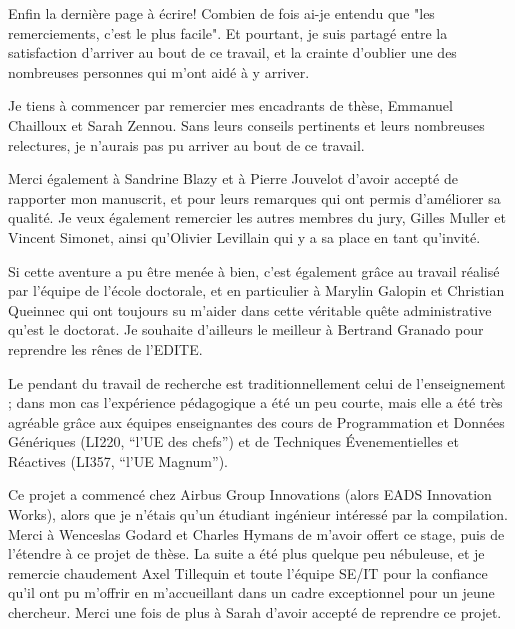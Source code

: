{
\setlength{\parskip}{1ex}

Enfin la dernière page à écrire! Combien de fois ai-je entendu que "les
remerciements, c'est le plus facile". Et pourtant, je suis partagé entre la
satisfaction d'arriver au bout de ce travail, et la crainte d'oublier une des
nombreuses personnes qui m'ont aidé à y arriver.


Je tiens à commencer par remercier mes encadrants de thèse, Emmanuel Chailloux
et Sarah Zennou. Sans leurs conseils pertinents et leurs nombreuses relectures,
je n'aurais pas pu arriver au bout de ce travail.


Merci également à Sandrine Blazy et à Pierre Jouvelot d'avoir accepté de
rapporter mon manuscrit, et pour leurs remarques qui ont permis d'améliorer sa
qualité. Je veux également remercier les autres membres du jury, Gilles Muller
et Vincent Simonet, ainsi qu'Olivier Levillain qui y a sa place en tant
qu'invité.


Si cette aventure a pu être menée à bien, c'est également grâce au travail
réalisé par l'équipe de l'école doctorale, et en particulier à Marylin Galopin
et Christian Queinnec qui ont toujours su m'aider dans cette véritable quête
administrative qu'est le doctorat. Je souhaite d'ailleurs le meilleur à Bertrand
Granado pour reprendre les rênes de l'EDITE.


Le pendant du travail de recherche est traditionnellement celui de
l'enseignement ; dans mon cas l'expérience pédagogique a été un peu courte, mais
elle a été très agréable grâce aux équipes enseignantes des cours de
Programmation et Données Génériques (LI220, \enquote{l'UE des chefs}) et de
Techniques Évenementielles et Réactives (LI357, \enquote{l'UE Magnum}).


Ce projet a commencé chez Airbus Group Innovations (alors EADS Innovation
Works), alors que je n'étais qu'un étudiant ingénieur intéressé par la
compilation. Merci à Wenceslas Godard et Charles Hymans de m'avoir offert ce
stage, puis de l'étendre à ce projet de thèse. La suite a été plus quelque peu
nébuleuse, et je remercie chaudement Axel Tillequin et toute l'équipe SE/IT pour
la confiance qu'il ont pu m'offrir en m'accueillant dans un cadre exceptionnel
pour un jeune chercheur. Merci une fois de plus à Sarah d'avoir accepté de
reprendre ce projet.

}
